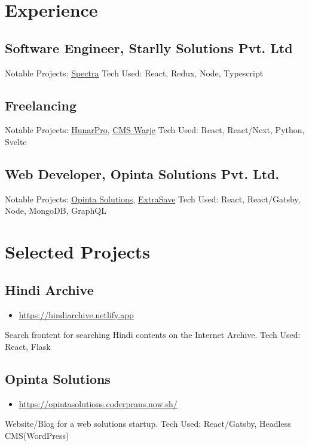 \documentclass[11pt]{article}
\begin{document}
\section*{Experience}
\label{sec:orgc0bd9b4}
\subsection*{Software Engineer, Starlly Solutions Pvt. Ltd}
\label{sec:orgd4a57b5}
Notable Projects: \href{https://v2.starlly.in}{Spectra}
Tech Used: React, Redux, Node, Typescript


\subsection*{Freelancing}
\label{sec:org8474160}
Notable Projects: \href{https://hunarpro.coderprans.vercel.app/}{HunarPro}, \href{https://warjecms.org/}{CMS Warje}
Tech Used: React, React/Next, Python, Svelte


\subsection*{Web Developer, Opinta Solutions Pvt. Ltd.}
\label{sec:org8bbb51e}
Notable Projects: \href{https://opintasolutions.coderprans.now.sh}{Opinta Solutions}, \href{https://extrasave.coderprans.now.sh/}{ExtraSave}  
Tech Used: React, React/Gatsby, Node, MongoDB, GraphQL 


\section*{Selected Projects}
\label{sec:org3d41aef}
\subsection*{Hindi Archive}
\label{sec:org3f9ba72}
\begin{itemize}
\item \url{https://hindiarchive.netlify.app}
\end{itemize}
Search frontent for searching Hindi contents on the Internet Archive.
Tech Used: React, Flask


\subsection*{Opinta Solutions}
\label{sec:org61a7b97}
\begin{itemize}
\item \url{https://opintasolutions.coderprans.now.sh/}
\end{itemize}
Website/Blog for a web solutions startup.
Tech Used: React/Gatsby, Headless CMS(WordPress)
\end{document}
